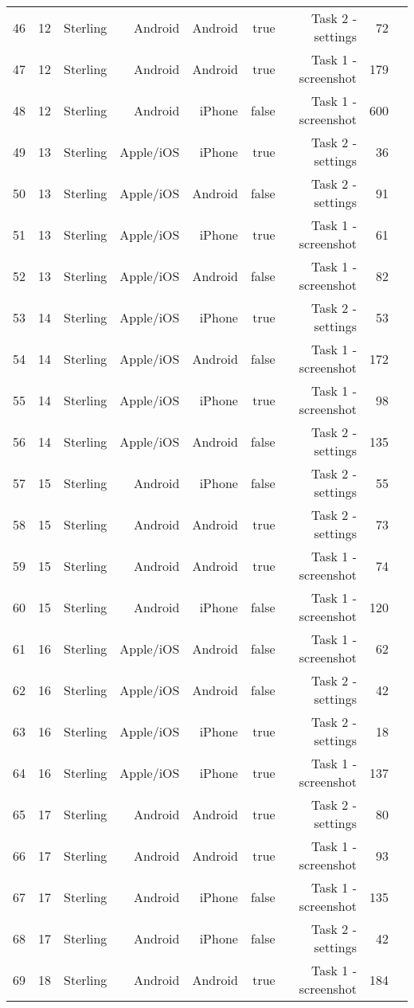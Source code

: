 \documentclass[conference]{IEEEtran}
\begin{document}
\begin{table}[!htp]
\begin{tabular}{lrrrrrrrr}
46 &12 &Sterling &Android &Android &true &Task 2 - settings &72 \\
47 &12 &Sterling &Android &Android &true &Task 1 - screenshot &179 \\
48 &12 &Sterling &Android &iPhone &false &Task 1 - screenshot &600 \\
49 &13 &Sterling &Apple/iOS &iPhone &true &Task 2 - settings &36 \\
50 &13 &Sterling &Apple/iOS &Android &false &Task 2 - settings &91 \\
51 &13 &Sterling &Apple/iOS &iPhone &true &Task 1 - screenshot &61 \\
52 &13 &Sterling &Apple/iOS &Android &false &Task 1 - screenshot &82 \\
53 &14 &Sterling &Apple/iOS &iPhone &true &Task 2 - settings &53 \\
54 &14 &Sterling &Apple/iOS &Android &false &Task 1 - screenshot &172 \\
55 &14 &Sterling &Apple/iOS &iPhone &true &Task 1 - screenshot &98 \\
56 &14 &Sterling &Apple/iOS &Android &false &Task 2 - settings &135 \\
57 &15 &Sterling &Android &iPhone &false &Task 2 - settings &55 \\
58 &15 &Sterling &Android &Android &true &Task 2 - settings &73 \\
59 &15 &Sterling &Android &Android &true &Task 1 - screenshot &74 \\
60 &15 &Sterling &Android &iPhone &false &Task 1 - screenshot &120 \\
61 &16 &Sterling &Apple/iOS &Android &false &Task 1 - screenshot &62 \\
62 &16 &Sterling &Apple/iOS &Android &false &Task 2 - settings &42 \\
63 &16 &Sterling &Apple/iOS &iPhone &true &Task 2 - settings &18 \\
64 &16 &Sterling &Apple/iOS &iPhone &true &Task 1 - screenshot &137 \\
65 &17 &Sterling &Android &Android &true &Task 2 - settings &80 \\
66 &17 &Sterling &Android &Android &true &Task 1 - screenshot &93 \\
67 &17 &Sterling &Android &iPhone &false &Task 1 - screenshot &135 \\
68 &17 &Sterling &Android &iPhone &false &Task 2 - settings &42 \\
69 &18 &Sterling &Android &Android &true &Task 1 - screenshot &184 \\

\end{tabular}
\end{table}
\end{document}

